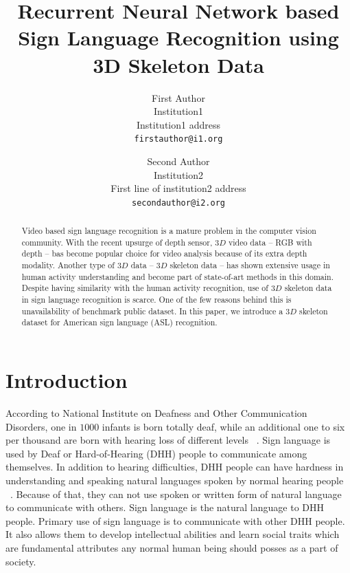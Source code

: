 \documentclass[10pt,twocolumn,letterpaper]{article}
\begin{document}
\title{Recurrent Neural Network based Sign Language Recognition using 3D Skeleton Data}

\author{First Author\\
Institution1\\
Institution1 address\\
{\tt\small firstauthor@i1.org}
\and
Second Author\\
Institution2\\
First line of institution2 address\\
{\tt\small secondauthor@i2.org}
}

\maketitle

\begin{abstract}
Video based sign language recognition is a mature problem in the computer vision community. With the recent upsurge of depth sensor, $3D$ video data -- RGB with depth -- bas become popular choice for video analysis because of its extra depth modality. Another type of $3D$ data -- $3D$ skeleton data -- has shown extensive usage in human activity understanding and become part of state-of-art methods in this domain. Despite having similarity with the human activity recognition, use of $3D$ skeleton data in sign language recognition is scarce. One of the few reasons behind this is unavailability of benchmark public dataset. In this paper, we introduce a $3D$ skeleton dataset for American sign language (ASL) recognition. 
\end{abstract}

\section{Introduction}

According to National Institute on Deafness and Other Communication Disorders, one in $1000$ infants is born totally deaf, while an additional one to six per thousand are born with hearing loss of different levels ~\cite{3072291}. Sign language is used by Deaf or Hard-of-Hearing (DHH) people to communicate among themselves. In addition to hearing difficulties, DHH people can have hardness in understanding and speaking natural languages spoken by normal hearing people ~\cite{doi:10.1080/01690965.2012.705006}. Because of that, they can not use spoken or written form of natural language to communicate with others. Sign language is the natural language to DHH people. Primary use of sign language is to communicate with other DHH people. It also allows them to develop intellectual abilities and learn social traits which are fundamental attributes any normal human being should posses as a part of society.
\end{document}
